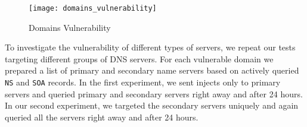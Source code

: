 

\begin{figure}[!hbt]
\centering
\texttt{[image: domains\_vulnerability]}
\caption{Domains Vulnerability}
\label{fig:domains_vulnerability}
\end{figure}

To investigate the vulnerability of different types of servers, we repeat our tests targeting different groups of DNS servers. For each vulnerable domain we prepared a list of primary and secondary name servers based on actively queried \texttt{NS} and \texttt{SOA} records. In the first experiment, we sent injects only to primary servers and queried primary and secondary servers right away and after 24 hours. In our second experiment, we targeted the secondary servers uniquely and again queried all the servers right away and after 24 hours. 

